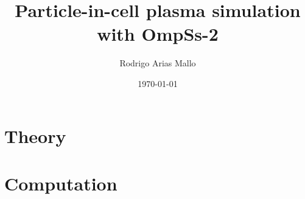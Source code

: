 \documentclass[a4paper,12pt]{book}
\title{Particle-in-cell plasma simulation with OmpSs-2}
\author{Rodrigo Arias Mallo}
\date{\today}
\begin{document}
\maketitle


\tableofcontents




\part{Theory}%






\part{Computation}%










%
%




\end{document}
